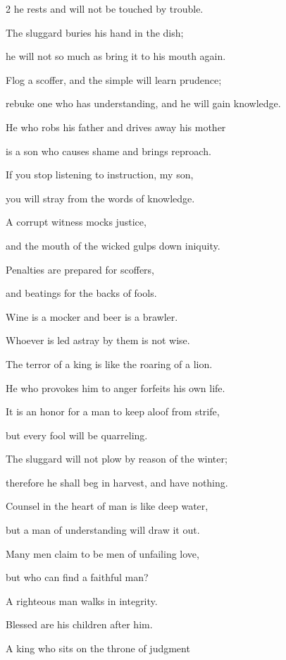 \begin{multicols}{2}
he rests and will not be touched by trouble.


\myverse{}The sluggard buries his hand in the dish;

he will not so much as bring it to his mouth again.


\myverse{}Flog a scoffer, and the simple will learn prudence;

rebuke one who has understanding, and he will gain knowledge.


\myverse{}He who robs his father and drives away his mother

is a son who causes shame and brings reproach.


\myverse{}If you stop listening to instruction, my son,

you will stray from the words of knowledge.


\myverse{}A corrupt witness mocks justice,

and the mouth of the wicked gulps down iniquity.


\myverse{}Penalties are prepared for scoffers,

and beatings for the backs of fools.


\mychapter{} \myverse*{}Wine is a mocker and beer is a brawler.

\quad\quad Whoever is led astray by them is not wise.


\myverse{}The terror of a king is like the roaring of a lion.

He who provokes him to anger forfeits his own life.


\myverse{}It is an honor for a man to keep aloof from strife,

but every fool will be quarreling.


\myverse{}The sluggard will not plow by reason of the winter;

therefore he shall beg in harvest, and have nothing.


\myverse{}Counsel in the heart of man is like deep water,

but a man of understanding will draw it out.


\myverse{}Many men claim to be men of unfailing love,

but who can find a faithful man?


\myverse{}A righteous man walks in integrity.

Blessed are his children after him.


\myverse{}A king who sits on the throne of judgment


\end{multicols}
